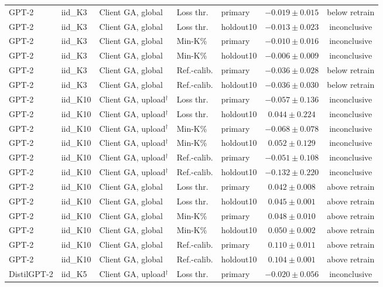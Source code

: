 {\begin{longtable}{@{\extracolsep{\fill}}lllllcc@{}}
GPT-2 & iid\_K3 & Client GA, global & Loss thr. & primary & $-0.019 \pm 0.015$ & below retrain \\
GPT-2 & iid\_K3 & Client GA, global & Loss thr. & holdout10 & $-0.013 \pm 0.023$ & inconclusive \\
GPT-2 & iid\_K3 & Client GA, global & Min-K\% & primary & $-0.010 \pm 0.016$ & inconclusive \\
GPT-2 & iid\_K3 & Client GA, global & Min-K\% & holdout10 & $-0.006 \pm 0.009$ & inconclusive \\
GPT-2 & iid\_K3 & Client GA, global & Ref.-calib. & primary & $-0.036 \pm 0.028$ & below retrain \\
GPT-2 & iid\_K3 & Client GA, global & Ref.-calib. & holdout10 & $-0.036 \pm 0.030$ & below retrain \\
GPT-2 & iid\_K10 & Client GA, upload$^{\dagger}$ & Loss thr. & primary & $-0.057 \pm 0.136$ & inconclusive \\
GPT-2 & iid\_K10 & Client GA, upload$^{\dagger}$ & Loss thr. & holdout10 & $0.044 \pm 0.224$ & inconclusive \\
GPT-2 & iid\_K10 & Client GA, upload$^{\dagger}$ & Min-K\% & primary & $-0.068 \pm 0.078$ & inconclusive \\
GPT-2 & iid\_K10 & Client GA, upload$^{\dagger}$ & Min-K\% & holdout10 & $0.052 \pm 0.129$ & inconclusive \\
GPT-2 & iid\_K10 & Client GA, upload$^{\dagger}$ & Ref.-calib. & primary & $-0.051 \pm 0.108$ & inconclusive \\
GPT-2 & iid\_K10 & Client GA, upload$^{\dagger}$ & Ref.-calib. & holdout10 & $-0.132 \pm 0.220$ & inconclusive \\
GPT-2 & iid\_K10 & Client GA, global & Loss thr. & primary & $0.042 \pm 0.008$ & above retrain \\
GPT-2 & iid\_K10 & Client GA, global & Loss thr. & holdout10 & $0.045 \pm 0.001$ & above retrain \\
GPT-2 & iid\_K10 & Client GA, global & Min-K\% & primary & $0.048 \pm 0.010$ & above retrain \\
GPT-2 & iid\_K10 & Client GA, global & Min-K\% & holdout10 & $0.050 \pm 0.002$ & above retrain \\
GPT-2 & iid\_K10 & Client GA, global & Ref.-calib. & primary & $0.110 \pm 0.011$ & above retrain \\
GPT-2 & iid\_K10 & Client GA, global & Ref.-calib. & holdout10 & $0.104 \pm 0.001$ & above retrain \\
DistilGPT-2 & iid\_K5 & Client GA, upload$^{\dagger}$ & Loss thr. & primary & $-0.020 \pm 0.056$ & inconclusive \\

\end{longtable}}
